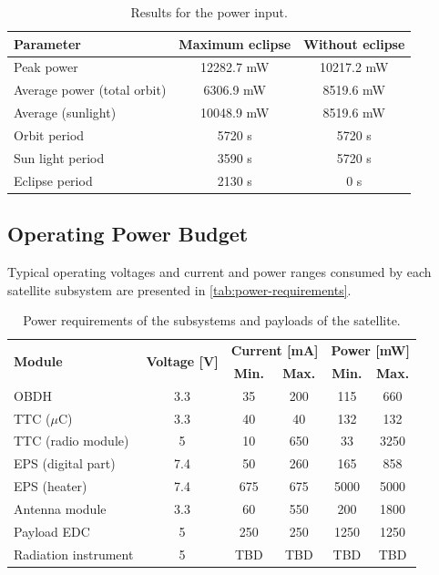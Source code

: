\begin{table}[!htb]
    \centering
    \begin{tabular}{lcc}
        \toprule[1.5pt]
        \textbf{Parameter} & \textbf{Maximum eclipse} & \textbf{Without eclipse} \\    \midrule
        Peak power & 12282.7 mW & 10217.2 mW\\
        Average power (total orbit) & 6306.9 mW & 8519.6 mW \\
        Average (sunlight) & 10048.9 mW & 8519.6 mW\\
        Orbit period & 5720 s & 5720 s \\
        Sun light period &  3590 s & 5720 s\\
        Eclipse period & 2130 s & 0 s \\
        \bottomrule[1.5pt]
    \end{tabular}
    \caption{Results for the power input.}
    \label{tab:power-simulations}
\end{table}


\subsection{Operating Power Budget}

Typical operating voltages and current and power ranges consumed by each satellite subsystem are presented in \autoref{tab:power-requirements}.

\begin{table}[!h]
    \centering
    \begin{tabular}{lccccc}
        \toprule[1.5pt]
        \multirow{2}{*}{\textbf{Module}} & \multirow{2}{*}{\textbf{Voltage [V]}}    & \multicolumn{2}{c}{\textbf{Current [mA]}} & \multicolumn{2}{c}{\textbf{Power [mW]}} \\
                                         &                                          & \textbf{Min.} & \textbf{Max.}             & \textbf{Min.} & \textbf{Max.} \\
        \midrule
        OBDH                & 3.3   & 35    & 200   & 115   & 660 \\
        TTC ($\mu$C)        & 3.3   & 40    & 40    & 132   & 132 \\
        TTC (radio module)  & 5     & 10    & 650   & 33    & 3250 \\
        EPS (digital part)  & 7.4   & 50    & 260   & 165   & 858 \\
        EPS (heater)        & 7.4   & 675   & 675   & 5000  & 5000 \\
        Antenna module      & 3.3   & 60    & 550   & 200   & 1800 \\
        Payload EDC         & 5     & 250   & 250   & 1250  & 1250 \\
        Radiation instrument           & 5     & TBD   & TBD   & TBD   & TBD \\
        \bottomrule[1.5pt]
    \end{tabular}
    \caption{Power requirements of the subsystems and payloads of the satellite.}
    \label{tab:power-requirements}
\end{table}

